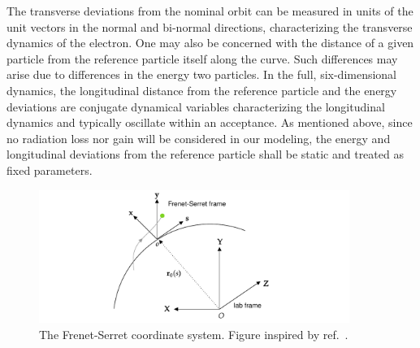 The transverse deviations from the nominal orbit can be measured in units of the unit vectors in the normal and bi-normal directions, characterizing the transverse dynamics of the electron. One may also be concerned with the distance of a given particle from the reference particle itself along the curve. Such differences may arise due to differences in the energy two particles. In the full, six-dimensional dynamics, the longitudinal distance from the reference particle and the energy deviations are conjugate dynamical variables characterizing the longitudinal dynamics and typically oscillate within an acceptance. As mentioned above, since no radiation loss nor gain will be considered in our modeling, the energy and longitudinal deviations from the reference particle shall be static and treated as fixed parameters.

\begin{figure}[htb]
    \centering
    \includegraphics[width=0.9\textwidth]{Images/frenetserret.pdf}
    \caption[The Frenet-Serret coordinate system]{The Frenet-Serret coordinate system. Figure inspired by ref.~\cite{huang_beam-based_2019}.}
    \label{fig:frenet-serret}
\end{figure}

